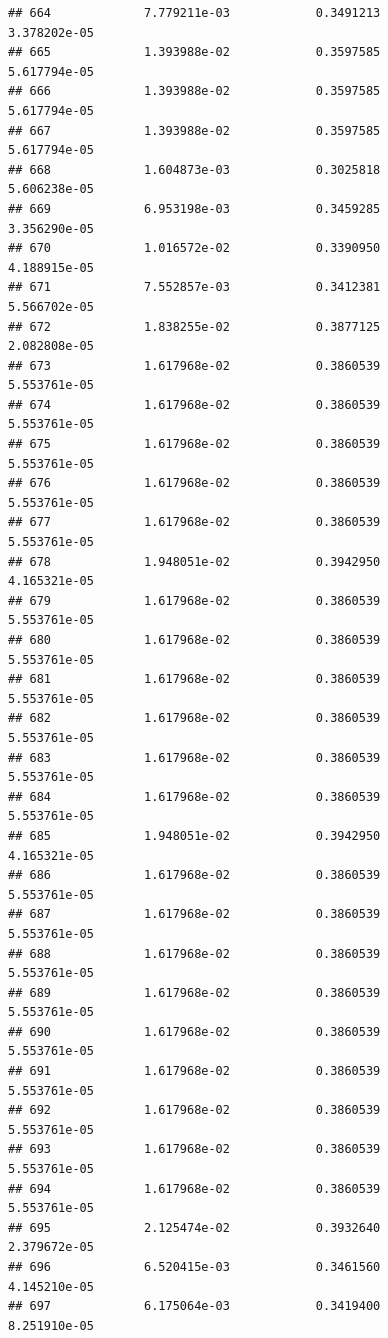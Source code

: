 \documentclass[
]{article}
\begin{document}
\begin{verbatim}
## 664             7.779211e-03            0.3491213            3.378202e-05
## 665             1.393988e-02            0.3597585            5.617794e-05
## 666             1.393988e-02            0.3597585            5.617794e-05
## 667             1.393988e-02            0.3597585            5.617794e-05
## 668             1.604873e-03            0.3025818            5.606238e-05
## 669             6.953198e-03            0.3459285            3.356290e-05
## 670             1.016572e-02            0.3390950            4.188915e-05
## 671             7.552857e-03            0.3412381            5.566702e-05
## 672             1.838255e-02            0.3877125            2.082808e-05
## 673             1.617968e-02            0.3860539            5.553761e-05
## 674             1.617968e-02            0.3860539            5.553761e-05
## 675             1.617968e-02            0.3860539            5.553761e-05
## 676             1.617968e-02            0.3860539            5.553761e-05
## 677             1.617968e-02            0.3860539            5.553761e-05
## 678             1.948051e-02            0.3942950            4.165321e-05
## 679             1.617968e-02            0.3860539            5.553761e-05
## 680             1.617968e-02            0.3860539            5.553761e-05
## 681             1.617968e-02            0.3860539            5.553761e-05
## 682             1.617968e-02            0.3860539            5.553761e-05
## 683             1.617968e-02            0.3860539            5.553761e-05
## 684             1.617968e-02            0.3860539            5.553761e-05
## 685             1.948051e-02            0.3942950            4.165321e-05
## 686             1.617968e-02            0.3860539            5.553761e-05
## 687             1.617968e-02            0.3860539            5.553761e-05
## 688             1.617968e-02            0.3860539            5.553761e-05
## 689             1.617968e-02            0.3860539            5.553761e-05
## 690             1.617968e-02            0.3860539            5.553761e-05
## 691             1.617968e-02            0.3860539            5.553761e-05
## 692             1.617968e-02            0.3860539            5.553761e-05
## 693             1.617968e-02            0.3860539            5.553761e-05
## 694             1.617968e-02            0.3860539            5.553761e-05
## 695             2.125474e-02            0.3932640            2.379672e-05
## 696             6.520415e-03            0.3461560            4.145210e-05
## 697             6.175064e-03            0.3419400            8.251910e-05

\end{verbatim}
\end{document}
